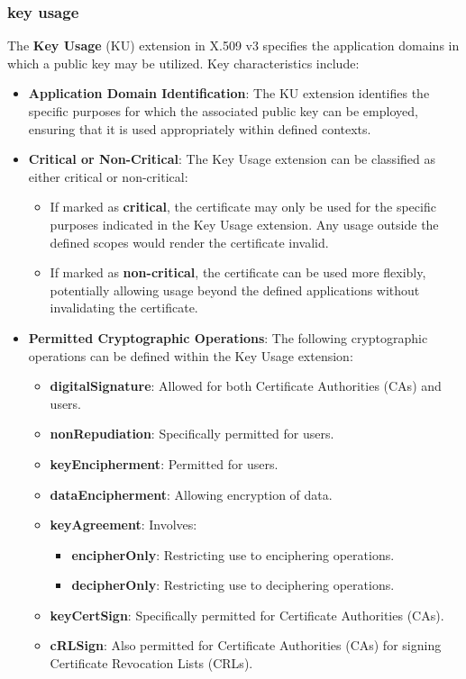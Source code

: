 \subsubsection{key usage}

The \textbf{Key Usage} (KU) extension in X.509 v3 specifies the
application domains in which a public key may be utilized. Key
characteristics include:

\begin{itemize}
  \item \textbf{Application Domain Identification}: The KU extension
    identifies the specific purposes for which the associated public
    key can be employed, ensuring that it is used appropriately
    within defined contexts.

  \item \textbf{Critical or Non-Critical}: The Key Usage extension
    can be classified as either critical or non-critical:
    \begin{itemize}
      \item If marked as \textbf{critical}, the certificate may only
        be used for the specific purposes indicated in the Key Usage
        extension. Any usage outside the defined scopes would render
        the certificate invalid.
      \item If marked as \textbf{non-critical}, the certificate can
        be used more flexibly, potentially allowing usage beyond the
        defined applications without invalidating the certificate.
    \end{itemize}

  \item \textbf{Permitted Cryptographic Operations}: The following
    cryptographic operations can be defined within the Key Usage
    extension:
    \begin{itemize}
      \item \textbf{digitalSignature}: Allowed for both Certificate
        Authorities (CAs) and users.
      \item \textbf{nonRepudiation}: Specifically permitted for
        users.
      \item \textbf{keyEncipherment}: Permitted for users.
      \item \textbf{dataEncipherment}: Allowing encryption of data.
      \item \textbf{keyAgreement}: Involves:
        \begin{itemize}
          \item \textbf{encipherOnly}: Restricting use to
            enciphering operations.
          \item \textbf{decipherOnly}: Restricting use to
            deciphering operations.
        \end{itemize}
      \item \textbf{keyCertSign}: Specifically permitted for
        Certificate Authorities (CAs).
      \item \textbf{cRLSign}: Also permitted for Certificate
        Authorities (CAs) for signing Certificate Revocation Lists
        (CRLs).
    \end{itemize}
\end{itemize}

